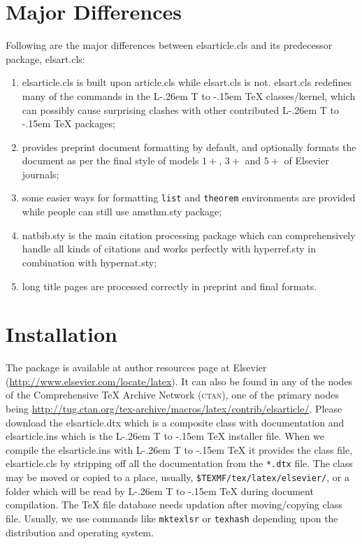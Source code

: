 \documentclass[a4paper,12pt]{article}
\makeatletter
\def\file#1{\textsf{#1}\xspace}
\DeclareRobustCommand{\LaTeX}{L\kern-.26em%
        {\sbox\z@ T%
         \vbox to\ht\z@{\hbox{\check@mathfonts
           \fontsize\sf@size\z@
           \math@fontsfalse\selectfont
          A\,}%
         \vss}%
        }%
     \kern-.15em%
    \TeX}
\makeatother
\begin{document}
\section{Major Differences}

Following are the major differences between \file{elsarticle.cls}
and its predecessor package, \file{elsart.cls}:

\begin{enumerate}[\textbullet]
\item \file{elsarticle.cls} is built upon \file{article.cls}
while \file{elsart.cls} is not. \file{elsart.cls} redefines
many of the commands in the \LaTeX{} classes/kernel, which can
possibly cause surprising clashes with other contributed
\LaTeX{} packages;

\item provides preprint document formatting by default, and
optionally formats the document as per the final
style of models $1+$, $3+$ and $5+$ of Elsevier journals;

\item some easier ways for formatting \verb+list+ and
\verb+theorem+ environments are provided while people can still
use \file{amsthm.sty} package;

\item \file{natbib.sty} is the main citation processing package
  which can comprehensively handle all kinds of citations and
works perfectly with \file{hyperref.sty} in combination with
\file{hypernat.sty};

\item long title pages are processed correctly in preprint and
  final formats.

\end{enumerate}

\section{Installation}

The package is available at author resources page at Elsevier
(\url{http://www.elsevier.com/locate/latex}).
It can also be found in any of the nodes of the Comprehensive
\TeX{} Archive Network (\textsc{ctan}), one of the primary nodes
being
\url{http://tug.ctan.org/tex-archive/macros/latex/contrib/elsarticle/}.
Please download the \file{elsarticle.dtx} which is a composite
class with documentation and \file{elsarticle.ins} which is the
\LaTeX{} installer file. When we compile the
\file{elsarticle.ins} with \LaTeX{} it provides the class file,
\file{elsarticle.cls} by
stripping off all the documentation from the \verb+*.dtx+ file.
The class may be moved or copied to a place, usually,
\verb+$TEXMF/tex/latex/elsevier/+, %
or a folder which will be read                   
by \LaTeX{} during document compilation.  The \TeX{} file
database needs updation after moving/copying class file.  Usually,
we use commands like \verb+mktexlsr+ or \verb+texhash+ depending
upon the distribution and operating system.
\end{document}
